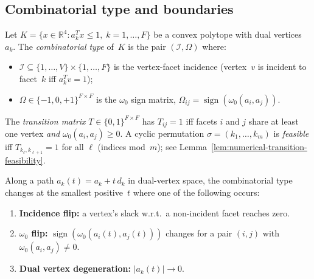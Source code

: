 %
%

\subsection{Combinatorial type and boundaries}
\label{sec:combinatorial-boundaries}

\begin{definition}\label{def:combinatorial-type}
Let $K = \{x \in \mathbb{R}^4 : a_k^T x \le 1,\; k = 1, \ldots, F\}$ be a
convex polytope with dual vertices $a_k$.
The \emph{combinatorial type} of~$K$ is the pair $(\mathcal{I}, \Omega)$ where:
\begin{itemize}
  \item $\mathcal{I} \subseteq \{1, \ldots, V\} \times \{1, \ldots, F\}$ is the
    vertex-facet incidence (vertex~$v$ is incident to facet~$k$ iff $a_k^T v = 1$);
  \item $\Omega \in \{-1, 0, +1\}^{F \times F}$ is the $\omega_0$ sign matrix,
    $\Omega_{ij} = \operatorname{sign}(\omega_0(a_i, a_j))$.
\end{itemize}
\end{definition}

\begin{definition}\label{def:transition-matrix}
The \emph{transition matrix} $T \in \{0,1\}^{F \times F}$ has $T_{ij} = 1$ iff
facets $i$ and $j$ share at least one vertex \emph{and} $\omega_0(a_i, a_j) \ge 0$.
A cyclic permutation $\sigma = (k_1, \ldots, k_m)$ is \emph{feasible} iff
$T_{k_\ell, k_{\ell+1}} = 1$ for all $\ell$ (indices mod~$m$);
see Lemma~\ref{lem:numerical-transition-feasibility}.
\end{definition}

\begin{definition}\label{def:boundary-events}
Along a path $a_k(t) = a_k + t \, d_k$ in dual-vertex space, the combinatorial
type changes at the smallest positive~$t$ where one of the following occurs:
\begin{enumerate}
  \item \textbf{Incidence flip:} a vertex's slack w.r.t.\ a non-incident facet
    reaches zero.
  \item \textbf{$\omega_0$ flip:} $\operatorname{sign}(\omega_0(a_i(t), a_j(t)))$
    changes for a pair $(i,j)$ with $\omega_0(a_i, a_j) \ne 0$.
  \item \textbf{Dual vertex degeneration:} $|a_k(t)| \to 0$.
\end{enumerate}
\end{definition}

